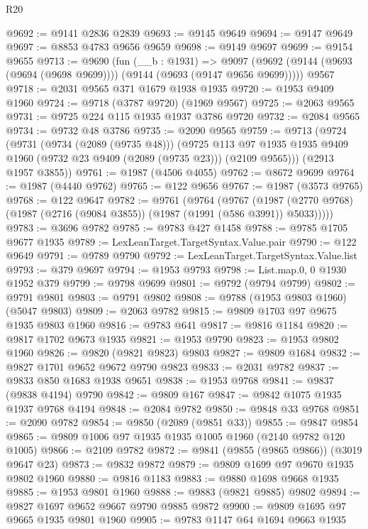 \begin{lexlean}{R20}
\begin{coremodule}
@9692 := @9141 @2836 @2839
@9693 := @9145 @9649
@9694 := @9147 @9649
@9697 := @8853 @4783 @9656 @9659
@9698 := @9149 @9697
@9699 := @9154 @9655
@9713 := @9690
    (fun (__b : @1931) =>
    @9097 (@9692 (@9144 (@9693 (@9694 (@9698 @9699)))) (@9144 (@9693 (@9147 @9656 @9699)))))
    @9567
@9718 := @2031 @9565 @371 @1679 @1938 @1935
@9720 := @1953 @9409 @1960
@9724 := @9718 (@3787 @9720) (@1969 @9567)
@9725 := @2063 @9565
@9731 := @9725 @224 @115 @1935 @1937 @3786 @9720
@9732 := @2084 @9565
@9734 := @9732 @48 @3786
@9735 := @2090 @9565
@9759 := @9713
    (@9724
      (@9731
        (@9734 (@2089 (@9735 @48)))
        (@9725
          @113
          @97
          @1935
          @1935
          @9409
          @1960
          (@9732 @23 @9409 (@2089 (@9735 @23)))
          (@2109 @9565)))
      (@2913 @1957 @3855))
@9761 := @1987 (@4506 @4055)
@9762 := @8672 @9699
@9764 := @1987 (@4440 @9762)
@9765 := @122 @9656
@9767 := @1987 (@3573 @9765)
@9768 := @122 @9647
@9782 := @9761
    (@9764
      (@9767
        (@1987 (@2770 @9768) (@1987 (@2716 (@9084 @3855)) (@1987 (@1991 (@586 @3991)) @5033)))))
@9783 := @3696 @9782
@9785 := @9783 @427 @1458
@9788 := @9785 @1705 @9677 @1935
@9789 := LexLeanTarget.TargetSyntax.Value.pair
@9790 := @122 @9649
@9791 := @9789 @9790
@9792 := LexLeanTarget.TargetSyntax.Value.list
@9793 := @379 @9697
@9794 := @1953 @9793
@9798 := List.map.{0, 0} @1930 @1952 @379
@9799 := @9798 @9699
@9801 := @9792 (@9794 @9799)
@9802 := @9791 @9801
@9803 := @9791 @9802
@9808 := @9788 (@1953 @9803 @1960) (@5047 @9803)
@9809 := @2063 @9782
@9815 := @9809 @1703 @97 @9675 @1935 @9803 @1960
@9816 := @9783 @641
@9817 := @9816 @1184
@9820 := @9817 @1702 @9673 @1935
@9821 := @1953 @9790
@9823 := @1953 @9802 @1960
@9826 := @9820 (@9821 @9823) @9803
@9827 := @9809 @1684
@9832 := @9827 @1701 @9652 @9672 @9790 @9823
@9833 := @2031 @9782
@9837 := @9833 @850 @1683 @1938 @9651
@9838 := @1953 @9768
@9841 := @9837 (@9838 @4194) @9790
@9842 := @9809 @167
@9847 := @9842 @1075 @1935 @1937 @9768 @4194
@9848 := @2084 @9782
@9850 := @9848 @33 @9768
@9851 := @2090 @9782
@9854 := @9850 (@2089 (@9851 @33))
@9855 := @9847 @9854
@9865 := @9809 @1006 @97 @1935 @1935 @1005 @1960 (@2140 @9782 @120 @1005)
@9866 := @2109 @9782
@9872 := @9841 (@9855 (@9865 @9866)) (@3019 @9647 @23)
@9873 := @9832 @9872
@9879 := @9809 @1699 @97 @9670 @1935 @9802 @1960
@9880 := @9816 @1183
@9883 := @9880 @1698 @9668 @1935
@9885 := @1953 @9801 @1960
@9888 := @9883 (@9821 @9885) @9802
@9894 := @9827 @1697 @9652 @9667 @9790 @9885 @9872
@9900 := @9809 @1695 @97 @9665 @1935 @9801 @1960
@9905 := @9783 @1147 @64 @1694 @9663 @1935

\end{coremodule}
\end{lexlean}
